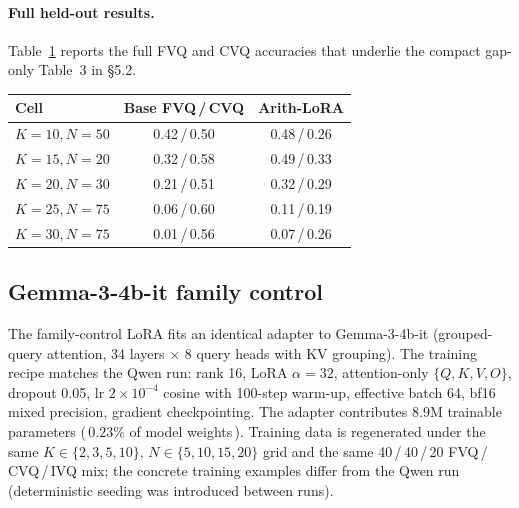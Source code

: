 \documentclass[letterpaper]{article} %
\begin{document}
\paragraph{Full held-out results.}
Table~\ref{tab:lora_arb_full} reports the full FVQ and CVQ
accuracies that underlie the compact gap-only Table~3
in \S5.2.

\begin{table}[!htb]
\centering
\begin{minipage}[t]{0.40\textwidth}
\centering
\footnotesize
\setlength{\tabcolsep}{3pt}
\begin{tabular}{lcc}
\toprule
Cell & Base FVQ\,/\,CVQ & Arith-LoRA \\
\midrule
$K{=}10, N{=}50$ & 0.42\,/\,0.50 & 0.48\,/\,0.26 \\
$K{=}15, N{=}20$ & 0.32\,/\,0.58 & 0.49\,/\,0.33 \\
$K{=}20, N{=}30$ & 0.21\,/\,0.51 & 0.32\,/\,0.29 \\
$K{=}25, N{=}75$ & 0.06\,/\,0.60 & 0.11\,/\,0.19 \\
$K{=}30, N{=}75$ & 0.01\,/\,0.56 & 0.07\,/\,0.26 \\
\bottomrule
\end{tabular}
\label{tab:lora_arith_control}
\end{minipage}
\hfill
\begin{minipage}[t]{0.56\textwidth}
\centering
\scriptsize

\label{tab:lora_arb_full}
\end{minipage}
\end{table}

\subsection{Gemma-3-4b-it family control}
\label{app:lora_gemma}

The family-control LoRA fits an identical adapter to
Gemma-3-4b-it (grouped-query attention, 34 layers $\times$ 8 query
heads with KV grouping). The training recipe matches the Qwen run:
rank 16, LoRA $\alpha=32$, attention-only $\{Q, K, V, O\}$,
dropout 0.05, lr $2\times10^{-4}$ cosine with 100-step warm-up,
effective batch 64, bf16 mixed precision, gradient checkpointing.
The adapter contributes $8.9\text{M}$ trainable parameters
(\,$0.23\%$ of model weights\,). Training data is regenerated under
the same $K \in \{2, 3, 5, 10\}$, $N \in \{5, 10, 15, 20\}$ grid
and the same 40\,/\,40\,/\,20 FVQ\,/\,CVQ\,/\,IVQ mix; the concrete
training examples differ from the Qwen run (deterministic seeding
was introduced between runs).
\end{document}
